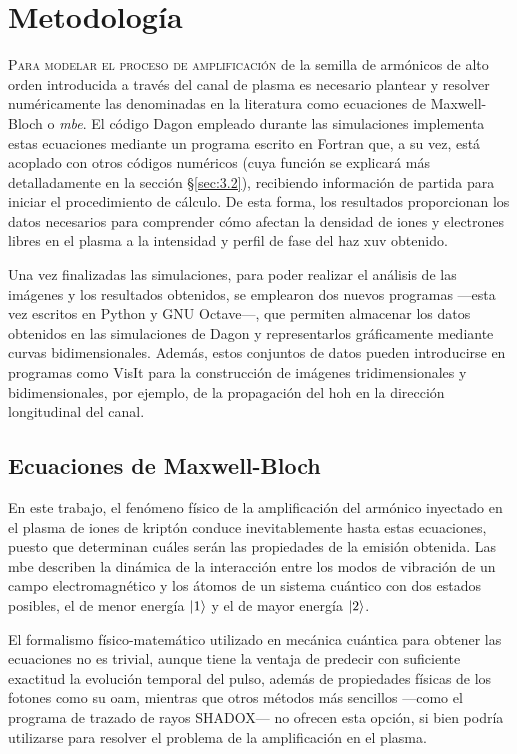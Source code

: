 \chapter{Metodología}\label{cap:3}
\lettrine{P}{ara modelar el proceso de amplificación} de la semilla de armónicos de alto orden introducida a través del canal de plasma es necesario plantear y resolver numéricamente las denominadas en la literatura como ecuaciones de Maxwell-Bloch o \emph{\acrfull{mbe}}. El código Dagon empleado durante las simulaciones implementa estas ecuaciones mediante un programa escrito en Fortran que, a su vez, está acoplado con otros códigos numéricos (cuya función se explicará más detalladamente en la sección \S\ref{sec:3.2}), recibiendo información de partida para iniciar el procedimiento de cálculo. De esta forma, los resultados proporcionan los datos necesarios para comprender cómo afectan la densidad de iones y electrones libres en el plasma a la intensidad y perfil de fase del haz \acrshort{xuv} obtenido. 

Una vez finalizadas las simulaciones, para poder realizar el análisis de las imágenes y los resultados obtenidos, se emplearon dos nuevos programas ---esta vez escritos en Python y GNU Octave---, que permiten almacenar los datos obtenidos en las simulaciones de Dagon y representarlos gráficamente mediante curvas bidimensionales. Además, estos conjuntos de datos pueden introducirse en programas como VisIt para la construcción de imágenes tridimensionales y bidimensionales, por ejemplo, de la propagación del \acrshort{hoh} en la dirección longitudinal del canal.

\section{Ecuaciones de Maxwell-Bloch}\label{sec:3.1}
En este trabajo, el fenómeno físico de la amplificación del armónico inyectado en el plasma de iones de kriptón conduce inevitablemente hasta estas ecuaciones, puesto que determinan cuáles serán las propiedades de la emisión obtenida. Las \acrshort{mbe} describen la dinámica de la interacción entre los modos de vibración de un campo electromagnético y los átomos de un sistema cuántico con dos estados posibles, el de menor energía $|1\rangle$ y el de mayor energía $|2\rangle$. 

El formalismo físico-matemático utilizado en mecánica cuántica para obtener las ecuaciones no es trivial\autocite{Cohen-Tannoudji2019a,Sakurai2020,Milonni1988}, aunque tiene la ventaja de predecir con suficiente exactitud la evolución temporal del pulso, además de propiedades físicas de los fotones como su \acrshort{oam}, mientras que otros métodos más sencillos ---como el programa de trazado de rayos SHADOX--- no ofrecen esta opción, si bien podría utilizarse para resolver el problema de la amplificación en el plasma. 

